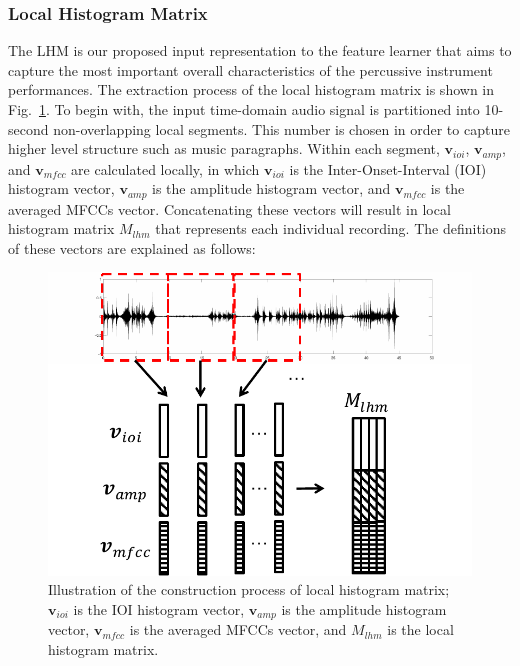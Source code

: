 \documentclass{article}
\begin{document}
\subsubsection{Local Histogram Matrix}
The LHM is our proposed input representation to the feature learner that aims to capture the most important overall characteristics of the percussive instrument performances. The extraction process of the local histogram matrix is shown in Fig.~\ref{fig:hist_mat}. To begin with, the input time-domain audio signal is partitioned into 10-second non-overlapping local segments. This number is chosen in order to capture higher level structure such as music paragraphs. Within each segment, $\mathbf{v}_{ioi}$, $\mathbf{v}_{amp}$, and $\mathbf{v}_{mfcc}$ are calculated locally, in which $\mathbf{v}_{ioi}$ is the Inter-Onset-Interval (IOI) histogram vector, $\mathbf{v}_{amp}$ is the amplitude histogram vector, and $\mathbf{v}_{mfcc}$ is the averaged MFCCs vector. Concatenating these vectors will result in local histogram matrix $M_{lhm}$ that represents each individual recording. The definitions of these vectors are explained as follows:
\begin{figure}
    \centering
    \includegraphics[width = 8 cm]{./figs/hist_mat.pdf}
    \caption{Illustration of the construction process of local histogram matrix; $\mathbf{v}_{ioi}$ is the IOI histogram vector, $\mathbf{v}_{amp}$ is the amplitude histogram vector, $\mathbf{v}_{mfcc}$ is the averaged MFCCs vector, and $M_{lhm}$ is the local histogram matrix.}
    \label{fig:hist_mat}
\end{figure}
\end{document}

